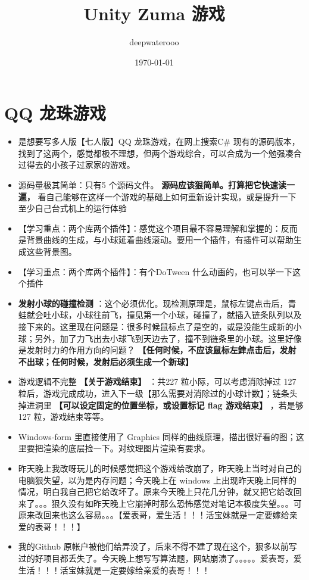 \documentclass[9pt, b5paper]{article}
\author{deepwaterooo}
\date{\today}
\title{Unity Zuma 游戏}
\begin{document}
\maketitle
\tableofcontents


\section{QQ 龙珠游戏}
\label{sec-1}
\begin{itemize}
\item 是想要写多人版【七人版】QQ 龙珠游戏，在网上搜索C\# 现有的源码版本，找到了这两个，感觉都极不理想，但两个游戏综合，可以合成为一个勉强凑合过得去的小孩子过家家的游戏。
\item 源码量极其简单：只有5 个源码文件。 \textbf{源码应该狠简单。打算把它快速读一遍，} 看自己能够在这样一个游戏的基础上如何重新设计实现，或是提升一下至少自己台式机上的运行体验
\item 【学习重点：两个库两个插件】：感觉这个项目最不容易理解和掌握的：反而是背景曲线的生成，与小球延着曲线滚动。要用一个插件，有插件可以帮助生成这些背景图。
\item 【学习重点：两个库两个插件】：有个DoTween 什么动画的，也可以学一下这个插件
\item \textbf{发射小球的碰撞检测} ：这个必须优化。现检测原理是，鼠标左键点击后，青蛙就会吐小球，小球往前飞，撞见第一个小球，碰撞了，就插入链条队列以及接下来的。这里现在问题是：很多时候鼠标点了是空的，或是没能生成新的小球；另外，加了力飞出去小球飞到天边去了，撞不到链条里的小球。这里好像是发射时力的作用方向的问题？ \textbf{【任何时候，不应该鼠标左銉点击后，发射不出球；任何时候，发射后必须生成一个新球】}
\item 游戏逻辑不完整 \textbf{【关于游戏结束】} ：共227 粒小际，可以考虑消除掉过 127 粒后，游戏完成成功，进入下一级【那么需要对消除过的小球计数】；链条头掉进洞里 \textbf{【可以设定固定的位置坐标，或设置标记 flag 游戏结束】} ，若是够 127 粒，游戏结束等等。
\item Windows-form 里直接使用了 Graphics 同样的曲线原理，描出很好看的图；这里要把渲染的底层捡一下。对纹理图片渲染有要求。
\item 昨天晚上我改呀玩儿的时候感觉把这个游戏给改崩了，昨天晚上当时对自己的电脑狠失望，以为是内存问题；今天晚上在 windows 上出现昨天晚上同样的情况，明白我自己把它给改坏了。原来今天晚上只花几分钟，就又把它给改回来了。。。狠久没有如昨天晚上它崩掉时那么恐怖感觉对笔记本极度失望。。。可原来改回来也这么容易。。。【爱表哥，爱生活！！！活宝妹就是一定要嫁给亲爱的表哥！！！】
\item 我的Github 原帐户被他们给弄没了，后来不得不建了现在这个，狠多以前写过的好项目都丢失了。今天晚上想写写算法题，网站崩溃了。。。。。爱表哥，爱生活！！！活宝妹就是一定要嫁给亲爱的表哥！！！
\end{itemize}
\end{document}
